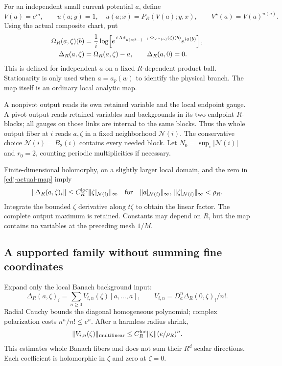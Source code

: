 \documentclass[11pt]{article}
\theoremstyle{remark}
\begin{document}
For an independent small current potential $a$, define
\[
 V(a)=e^{ia},\qquad
 u(a;y)=1,\quad u(a;x)=P_R(V(a);y,x),\qquad
 V^\star(a)=V(a)^{u(a)}.
\]
Using the actual composite chart, put
\begin{align}
 \Omega_R(a,\zeta)(b)
  &=\frac1i\log\!\left[
    e^{\,i\operatorname{Ad}_{u(a;b_-)^{-1}}
                 \Phi_{V^\star(a)}(\zeta)(b)}
       e^{ia(b)}\right],\notag\\
 \Delta_R(a,\zeta)&=\Omega_R(a,\zeta)-a,\qquad
 \Delta_R(a,0)=0.                                      \label{cdj-actual-map}
\end{align}
This is defined for independent $a$ on a fixed
$R$-dependent product ball. Stationarity is only used when
$a=a_p(w)$ to identify the physical branch. The map itself
is an ordinary local analytic map.

A nonpivot output reads its own retained variable and
the local endpoint gauge. A pivot output reads retained
variables and backgrounds in its two endpoint $R$-blocks;
all gauges on those links are internal to the same blocks.
Thus the whole output fiber at $i$ reads $a,\zeta$ in a
fixed neighborhood $\mathcal N(i)$. The conservative choice
$\mathcal N(i)=B_2(i)$ contains every needed block.
Let $N_0=\sup_i|\mathcal N(i)|$ and $r_0=2$, counting
periodic multiplicities if necessary.

Finite-dimensional holomorphy, on a slightly larger local
domain, and the zero in \eqref{cdj-actual-map} imply
\begin{equation}\label{cdj-local-bound}
 \|\Delta_R(a,\zeta)_i\|
    \le C_R^{\rm loc}\|\zeta|_{\mathcal N(i)}\|_\infty
 \quad\text{for}\quad
 \|a|_{\mathcal N(i)}\|_\infty,\,
 \|\zeta|_{\mathcal N(i)}\|_\infty<\rho_R.
\end{equation}
Integrate the bounded $\zeta$ derivative along $t\zeta$
to obtain the linear factor. The complete output maximum
is retained. Constants may depend on $R$, but the map
contains no variables at the preceding mesh $1/M$.

\subsection{A supported family without summing fine coordinates}
\label{cdj-Banach-Taylor-section}

Expand only the local Banach background input:
\[
 \Delta_R(a,\zeta)_i
   =\sum_{n\ge0}V_{i,n}(\zeta)[a,\ldots,a],
 \qquad V_{i,n}=D_a^n\Delta_R(0,\zeta)_i/n!.
\]
Radial Cauchy bounds the diagonal homogeneous polynomial;
complex polarization costs $n^n/n!\le e^n$. After a
harmless radius shrink,
\begin{equation}\label{cdj-vertex-bound}
 \|V_{i,n}(\zeta)\|_{\rm multilinear}
       \le C_R^{\rm loc}\|\zeta\|(e/\rho_R)^n.
\end{equation}
This estimates whole Banach fibers and does not sum their
$R^d$ scalar directions. Each coefficient is holomorphic
in $\zeta$ and zero at $\zeta=0$.
\end{document}
